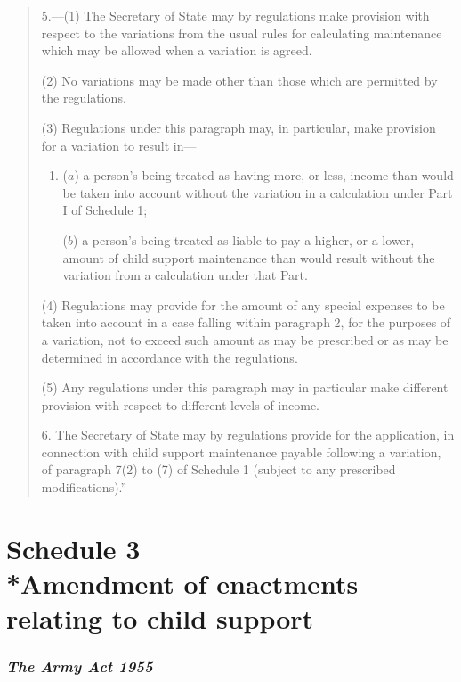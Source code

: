 \documentclass[12pt,a4paper]{article}
\begin{document}
\begin{quotation}
5.---(1) The Secretary of State may by regulations make provision with respect to the variations from the usual rules for calculating maintenance which may be allowed when a variation is agreed.

(2) No variations may be made other than those which are permitted by the regulations.

(3) Regulations under this paragraph may, in particular, make provision for a variation to result in—
\begin{enumerate}\item[]
($a$) a person’s being treated as having more, or less, income than would be taken into account without the variation in a calculation under Part I of Schedule 1;

($b$) a person’s being treated as liable to pay a higher, or a lower, amount of child support maintenance than would result without the variation from a calculation under that Part.
\end{enumerate}

(4) Regulations may provide for the amount of any special expenses to be taken into account in a case falling within paragraph 2, for the purposes of a variation, not to exceed such amount as may be prescribed or as may be determined in accordance with the regulations.

(5) Any regulations under this paragraph may in particular make different provision with respect to different levels of income.

\medskip

6. The Secretary of State may by regulations provide for the application, in connection with child support maintenance payable following a variation, of paragraph 7(2)  to (7)  of Schedule 1 (subject to any prescribed modifications).”
\end{quotation}

\part[Schedule 3 --- Amendment of enactments relating to child support]{Schedule 3\\*Amendment of enactments relating to child support}

\renewcommand\parthead{--- Schedule 3}

\section*{\itshape The Army Act 1955}
\end{document}
